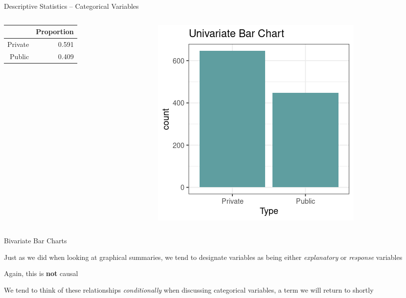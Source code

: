 \documentclass{beamer}
\begin{document}
\begin{frame}{Descriptive Statistics -- Categorical Variables}
\begin{columns}
\begin{column}{0.45\textwidth}
{%
\begin{table}[ht]
\centering
\begin{tabular}{rr}
  \hline
 & Proportion \\ 
  \hline
Private & 0.591 \\ 
  Public & 0.409 \\ 
   \hline
\end{tabular}
\end{table}
}
  \end{column}
  \begin{column}{0.45\textwidth}
\begin{center}
\includegraphics[scale=0.35]{univariate_bar.png}
\end{center}
  \end{column}

\end{columns}

\end{frame}

\begin{frame}{Bivariate Bar Charts}

Just as we did when looking at graphical summaries, we tend to designate variables as being either \textit{explanatory} or \textit{response} variables \vspace{4mm}

Again, this is \textbf{not} causal \vspace{4mm}

We tend to think of these relationships \textit{conditionally} when discussing categorical variables, a term we will return to shortly

\end{frame}
\end{document}
